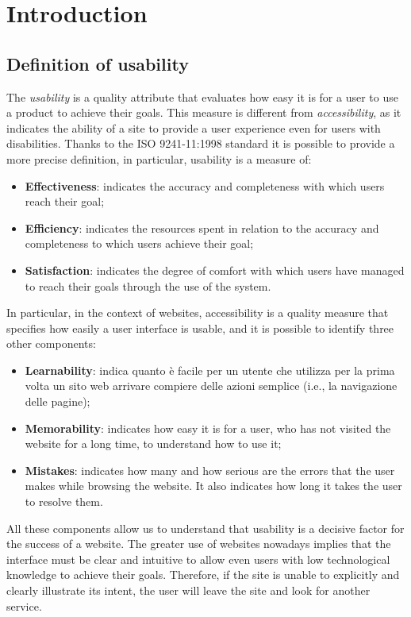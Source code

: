 \section{Introduction}

\subsection{Definition of usability}
The \textit{usability} is a quality attribute that evaluates how easy it is 
for a user to use a product to achieve their goals. This measure is 
different from \textit{accessibility}, as it indicates the ability of a 
site to provide a user experience even for users with disabilities. Thanks 
to the ISO 9241-11:1998 standard it is possible to provide a more precise 
definition, in particular, usability is a measure of:
\begin{itemize}
  \item \textbf{Effectiveness}: indicates the accuracy and completeness 
  with which users reach their goal;

  \item \textbf{Efficiency}: indicates the resources spent in relation to 
  the accuracy and completeness to which users achieve their goal;

  \item \textbf{Satisfaction}: indicates the degree of comfort with which 
  users have managed to reach their goals through the use of the system.
\end{itemize}

In particular, in the context of websites, accessibility is a quality 
measure that specifies how easily a user interface is usable, and it is 
possible to identify three other components:
\begin{itemize}
  \item \textbf{Learnability}: indica quanto è facile per un utente che 
  utilizza per la prima volta un sito web arrivare compiere delle azioni 
  semplice (i.e., la navigazione delle pagine);

  \item \textbf{Memorability}: indicates how easy it is for a user, who has 
  not visited the website for a long time, to understand how to use it;

  \item \textbf{Mistakes}: indicates how many and how serious are the 
  errors that the user makes while browsing the website. It also indicates 
  how long it takes the user to resolve them.
\end{itemize}

All these components allow us to understand that usability is a decisive 
factor for the success of a website. The greater use of websites nowadays 
implies that the interface must be clear and intuitive to allow even users 
with low technological knowledge to achieve their goals. Therefore, if the 
site is unable to explicitly and clearly illustrate its intent, the user 
will leave the site and look for another service.